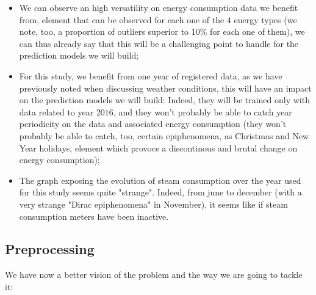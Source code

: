\documentclass[twocolumn, switch]{article}
\begin{document}
\begin{itemize}
\item We can observe an high versatility on energy consumption data we benefit from, element that can be observed for each one of the $4$ energy types (we note, too, a proportion of outliers superior to 10\% for each one of them), we can thus already say that this will be a challenging point to handle for the prediction models we will build;
\item For this study, we benefit from one year of registered data, as we have previously noted when discussing weather conditions, this will have an impact on the prediction models we will build: Indeed, they will be trained only with data related to year $2016$, and they won't probably be able to catch year periodicity on the data and associated energy consumption (they won't probably be able to catch, too, certain epiphenomena, as Christmas and New Year holidays, element which provocs a discontinous and brutal change on energy consumption);
\item The graph exposing the evolution of steam consumption over the year used for this study seems quite "strange". Indeed, from june to december (with a very strange "Dirac epiphenomena" in November), it seems like if steam consumption meters have been inactive.
\end{itemize}

\subsection{Preprocessing}

We have now a better vision of the problem and the way we are going to tackle it:
\end{document}
